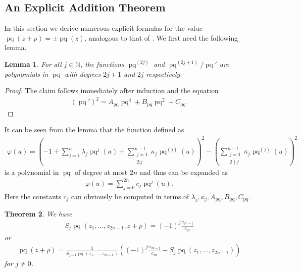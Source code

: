 \documentclass{amsart}
\newtheorem{theorem}{Theorem}[section]
\newtheorem{lemma}[theorem]{Lemma}
\theoremstyle{definition}
\DeclareMathOperator{\pq}{pq}
\begin{document}
\subsection{An Explicit Addition Theorem}
In this section we derive numerous explicit formulas for the value $\pq(z+\rho)=\pm \pq(z)$, analogous to that of \cite{Gürel}. We first need the following lemma.
\begin{lemma}
    For all $j\in \mathbb{N}$, the functions $\pq^{(2j)}$ and $\pq^{(2j+1)}/\pq'$ are polynomials in $\pq$ with degrees $2j+1$ and $2j$ respectively.
\end{lemma}
\begin{proof}
    The claim follows immediately after induction and the equation
    \begin{align*}
        \left(\pq'\right)^2=A_{\pq}\pq^4+B_{\pq}\pq^2+C_{\pq}.
    \end{align*}
\end{proof}
It can be seen from the lemma that the function defined as
\begin{align*}
    \varphi(u)=\left( -1+\sum_{j=1}^{n}\lambda_j \pq^j(u)+\sum_{\substack{j=1\\ 2|j}}^{n-1}\kappa_j\pq^{(j)}(u) \right)^2-\left( \sum_{\substack{j=1\\ 2\nmid j}}^{n-1}\kappa_j\pq^{(j)}(u) \right)^2
\end{align*}
is a polynomial in $\pq$ of degree at most $2n$ and thus can be expanded as
\begin{align*}
    \varphi(u)=\sum_{j=0}^{2n}c_j\pq^{j}(u).
\end{align*}
Here the constants $c_j$ can obviously be computed in terms of $\lambda_j,\kappa_j,A_{\pq},B_{\pq},C_{\pq}$.
\begin{theorem}
    We have
    \begin{align*}
        S_j\pq(z_1,\ldots,z_{2n-1},z+\rho)=(-1)^j\frac{c_{2n-j}}{c_{2n}}
    \end{align*}
    or
    \begin{align*}
        \pq(z+\rho)=\frac{1}{S_{j-1}\pq(z_1,\ldots,z_{2n-1})}\left( (-1)^j\frac{c_{2n-j}}{c_{2n}}-S_{j}\pq(z_1,\ldots,z_{2n-1}) \right)
    \end{align*}
    for $j\neq 0$.
\end{theorem}
\end{document}
